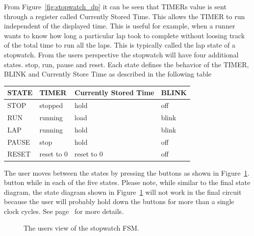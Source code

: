 \begin{enumerate}
From Figure~\ref{fig:stopwatch_dp} it can be seen that TIMERs
value is sent through a register called Currently Stored Time.
This allows the TIMER to run independent of the displayed time.
This is useful for example, when a runner wants to know how long 
a particular lap took to complete without loosing track of the 
total time to run all the laps.
This is typically called the lap state of a stopwatch.  From the 
users perspective the stopwatch will have four additional
states.  stop, run,  pause and reset.  Each state defines the
behavior of the TIMER, BLINK and Currently Store Time as described
in the following table

\begin{tabular}{l||l|l|l}
STATE	&	TIMER	& Currently Stored Time	& BLINK	\\ \hline \hline
STOP	&	stopped	&	hold		& off	\\ \hline
RUN	&	running	&	load		& blink	\\ \hline
LAP	&	running &	hold		& blink	\\ \hline
PAUSE	& 	stop	& 	hold		& off	\\ \hline
RESET	& reset to 0	& reset to 0		& off	\\ 
\end{tabular}

The user moves between the states by pressing the buttons
as shown in Figure~\ref{fig:stopwatch_fsm}.
button while in each of the five states.  Please note, while 
similar to the final state diagram, the state diagram shown in 
Figure~\ref{fig:stopwatch_fsm} will not work in the final circuit
because the user will probably hold down the buttons for more 
than a single clock cycles.  See page~\pageref{page:push_dp}
for more details.

\begin{figure}[ht]
\caption{The users view of the stopwatch FSM.}
\label{fig:stopwatch_fsm}
\end{figure}


\end{enumerate}
